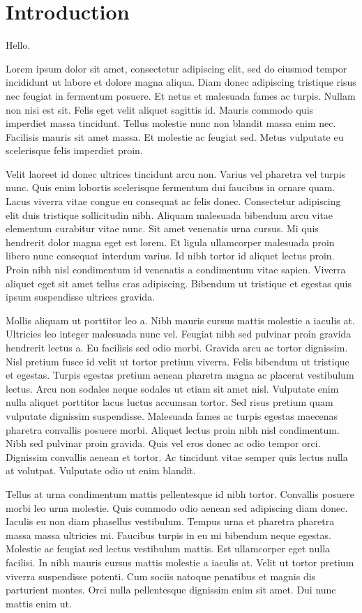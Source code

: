 
\chapter{Introduction}
Hello. 

Lorem ipsum dolor sit amet, consectetur adipiscing elit, sed do eiusmod tempor incididunt ut labore et dolore magna aliqua. Diam donec adipiscing tristique risus nec feugiat in fermentum posuere. Et netus et malesuada fames ac turpis. Nullam non nisi est sit. Felis eget velit aliquet sagittis id. Mauris commodo quis imperdiet massa tincidunt. Tellus molestie nunc non blandit massa enim nec. Facilisis mauris sit amet massa. Et molestie ac feugiat sed. Metus vulputate eu scelerisque felis imperdiet proin.

Velit laoreet id donec ultrices tincidunt arcu non. Varius vel pharetra vel turpis nunc. Quis enim lobortis scelerisque fermentum dui faucibus in ornare quam. Lacus viverra vitae congue eu consequat ac felis donec. Consectetur adipiscing elit duis tristique sollicitudin nibh. Aliquam malesuada bibendum arcu vitae elementum curabitur vitae nunc. Sit amet venenatis urna cursus. Mi quis hendrerit dolor magna eget est lorem. Et ligula ullamcorper malesuada proin libero nunc consequat interdum varius. Id nibh tortor id aliquet lectus proin. Proin nibh nisl condimentum id venenatis a condimentum vitae sapien. Viverra aliquet eget sit amet tellus cras adipiscing. Bibendum ut tristique et egestas quis ipsum suspendisse ultrices gravida.

Mollis aliquam ut porttitor leo a. Nibh mauris cursus mattis molestie a iaculis at. Ultricies leo integer malesuada nunc vel. Feugiat nibh sed pulvinar proin gravida hendrerit lectus a. Eu facilisis sed odio morbi. Gravida arcu ac tortor dignissim. Nisl pretium fusce id velit ut tortor pretium viverra. Felis bibendum ut tristique et egestas. Turpis egestas pretium aenean pharetra magna ac placerat vestibulum lectus. Arcu non sodales neque sodales ut etiam sit amet nisl. Vulputate enim nulla aliquet porttitor lacus luctus accumsan tortor. Sed risus pretium quam vulputate dignissim suspendisse. Malesuada fames ac turpis egestas maecenas pharetra convallis posuere morbi. Aliquet lectus proin nibh nisl condimentum. Nibh sed pulvinar proin gravida. Quis vel eros donec ac odio tempor orci. Dignissim convallis aenean et tortor. Ac tincidunt vitae semper quis lectus nulla at volutpat. Vulputate odio ut enim blandit.

Tellus at urna condimentum mattis pellentesque id nibh tortor. Convallis posuere morbi leo urna molestie. Quis commodo odio aenean sed adipiscing diam donec. Iaculis eu non diam phasellus vestibulum. Tempus urna et pharetra pharetra massa massa ultricies mi. Faucibus turpis in eu mi bibendum neque egestas. Molestie ac feugiat sed lectus vestibulum mattis. Est ullamcorper eget nulla facilisi. In nibh mauris cursus mattis molestie a iaculis at. Velit ut tortor pretium viverra suspendisse potenti. Cum sociis natoque penatibus et magnis dis parturient montes. Orci nulla pellentesque dignissim enim sit amet. Dui nunc mattis enim ut.


